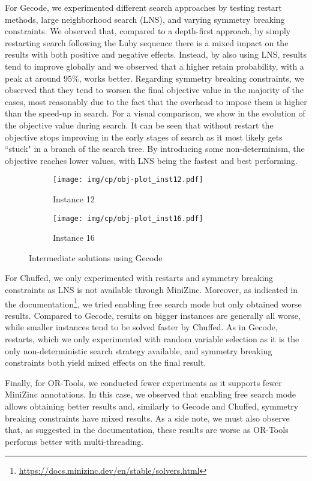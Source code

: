 For Gecode, we experimented different search approaches by testing restart methods, large neighborhood search (LNS), and varying symmetry breaking constraints. We observed that, compared to a depth-first approach, by simply restarting search following the Luby sequence there is a mixed impact on the results with both positive and negative effects. Instead, by also using LNS, results tend to improve globally and we observed that a higher retain probability, with a peak at around $95\%$, works better. Regarding symmetry breaking constraints, we observed that they tend to worsen the final objective value in the majority of the cases, most reasonably due to the fact that the overhead to impose them is higher than the speed-up in search. For a visual comparison, we show in  the evolution of the objective value during search. It can be seen that without restart the objective stops improving in the early stages of search as it most likely gets ``stuck" in a branch of the search tree. By introducing some non-determinism, the objective reaches lower values, with LNS being the fastest and best performing.

\begin{figure}[H]
    \centering
    \begin{subfigure}{0.49\linewidth}
        \centering
        \texttt{[image: img/cp/obj-plot\_inst12.pdf]}
        \caption{Instance 12}
    \end{subfigure}
    \hfill
    \begin{subfigure}{0.49\linewidth}
        \centering
        \texttt{[image: img/cp/obj-plot\_inst16.pdf]}
        \caption{Instance 16}
    \end{subfigure}
    \caption{Intermediate solutions using Gecode}
    \label{fig:cp_obj_plots}
\end{figure}

For Chuffed, we only experimented with restarts and symmetry breaking constraints as LNS is not available through MiniZinc. Moreover, as indicated in the documentation\footnote{\url{https://docs.minizinc.dev/en/stable/solvers.html}}, we tried enabling free search mode but only obtained worse results. Compared to Gecode, results on bigger instances are generally all worse, while smaller instances tend to be solved faster by Chuffed. As in Gecode, restarts, which we only experimented with random variable selection as it is the only non-deterministic search strategy available, and symmetry breaking constraints both yield mixed effects on the final result.

Finally, for OR-Tools, we conducted fewer experiments as it supports fewer MiniZinc annotations. In this case, we observed that enabling free search mode allows obtaining better results and, similarly to Gecode and Chuffed, symmetry breaking constraints have mixed results. As a side note, we must also observe that, as suggested in the documentation, these results are worse as OR-Tools performs better with multi-threading.